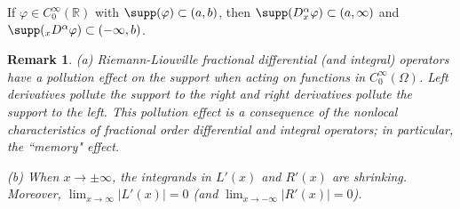 \documentclass[leqno,final]{siamltex}
\numberwithin{equation}{section}
\newtheorem{remark}{Remark}[section]
\newcommand{\Ome}{{\Omega}}
\renewcommand{\(}{\bigl(}
\renewcommand{\)}{\bigr)}
\newcommand{\R}{\mathbb{R}}
\begin{document}
          
        \begin{proposition} \label{Pollution}
            If $\varphi \in C^{\infty}_{0} (\R)$ with $\supp(\varphi) \subset (a,b)$, then $\supp({}{{D}}{^{\alpha}_{x}} \varphi)\subset (a, \infty)$ and $\supp({_{x}}{{D}}{^{\alpha}} \varphi)\subset (-\infty, b)$. %
        \end{proposition}
    
          
        \begin{remark}
    	    (a) Riemann-Liouville fractional differential (and integral) operators have a pollution effect on the support when acting on functions in $C^\infty_0 (\Ome)$. Left derivatives pollute the support to the right and right derivatives pollute the support to the left. 
    	    This pollution effect is a consequence of the nonlocal characteristics of fractional order differential and integral operators; in particular, the ``memory" effect.  
    	 
    	    (b) When $x\to \pm \infty$, the integrands in $L'(x)$ and $R'(x)$  
    	    are shrinking. Moreover, $\lim_{x \rightarrow \infty} |L'(x)| = 0$ (and $\lim_{x \rightarrow -\infty} |R'(x)| = 0$). 
        \end{remark}
       
\end{document}
